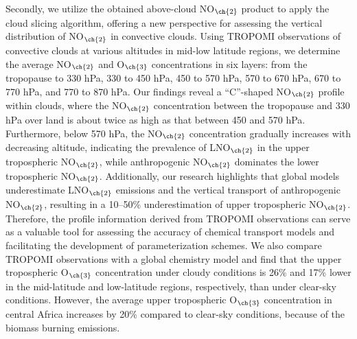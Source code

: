 {Secondly, we utilize the obtained above-cloud NO$_{\ch{2}}$ product to apply the cloud slicing algorithm, offering a new perspective for assessing the vertical distribution of NO$_{\ch{2}}$ in convective clouds.
Using TROPOMI observations of convective clouds at various altitudes in mid-low latitude regions, we determine the average NO$_{\ch{2}}$ and O$_{\ch{3}}$ concentrations in six layers: from the tropopause to 330 hPa, 330 to 450 hPa, 450 to 570 hPa, 570 to 670 hPa, 670 to 770 hPa, and 770 to 870 hPa.
Our findings reveal a ``C''-shaped NO$_{\ch{2}}$ profile within clouds, where the NO$_{\ch{2}}$ concentration between the tropopause and 330 hPa over land is about twice as high as that between 450 and 570 hPa.
Furthermore, below 570 hPa, the NO$_{\ch{2}}$ concentration gradually increases with decreasing altitude, indicating the prevalence of LNO$_{\ch{2}}$ in the upper tropospheric NO$_{\ch{2}}$, while anthropogenic NO$_{\ch{2}}$ dominates the lower tropospheric NO$_{\ch{2}}$.
Additionally, our research highlights that global models underestimate LNO$_{\ch{2}}$ emissions and the vertical transport of anthropogenic NO$_{\ch{2}}$, resulting in a 10--50\% underestimation of upper tropospheric NO$_{\ch{2}}$.
Therefore, the profile information derived from TROPOMI observations can serve as a valuable tool for assessing the accuracy of chemical transport models and facilitating the development of parameterization schemes.
We also compare TROPOMI observations with a global chemistry model and find that the upper tropospheric O$_{\ch{3}}$ concentration under cloudy conditions is 26\% and 17\% lower in the mid-latitude and low-latitude regions, respectively, than under clear-sky conditions.
However, the average upper tropospheric O$_{\ch{3}}$ concentration in central Africa increases by 20\% compared to clear-sky conditions, because of the biomass burning emissions.

}

